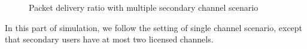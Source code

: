 \begin{figure}[htb!]
\label{fig:multiple_pioffCase}
\caption{Packet delivery ratio with multiple secondary channel scenario}
\end{figure}
In this part of simulation, we follow the setting of single channel scenario, except that secondary users have at most two licensed channels.

